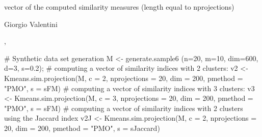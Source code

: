 \documentclass{article}
\begin{document}
\begin{Value}
vector of the computed similarity measures (length equal to nprojections)
\end{Value}
\begin{Author}\relax
Giorgio Valentini 
\end{Author}
\begin{SeeAlso}\relax
{}, 
\end{SeeAlso}
\begin{Examples}
\begin{ExampleCode}
# Synthetic data set generation
M <- generate.sample6 (n=20, m=10, dim=600, d=3, s=0.2);
# computing a vector of similarity indices with 2 clusters:
v2 <- Kmeans.sim.projection(M, c = 2, nprojections = 20, dim = 200, 
                            pmethod = "PMO", s = sFM)
# computing a vector of similarity indices with 3 clusters:
v3 <- Kmeans.sim.projection(M, c = 3, nprojections = 20, dim = 200, 
                            pmethod = "PMO", s = sFM)
# computing a vector of similarity indices with 2 clusters using the Jaccard index
v2J <- Kmeans.sim.projection(M, c = 2, nprojections = 20, dim = 200, 
                             pmethod = "PMO", s = sJaccard)
\end{ExampleCode}
\end{Examples}
\end{document}
